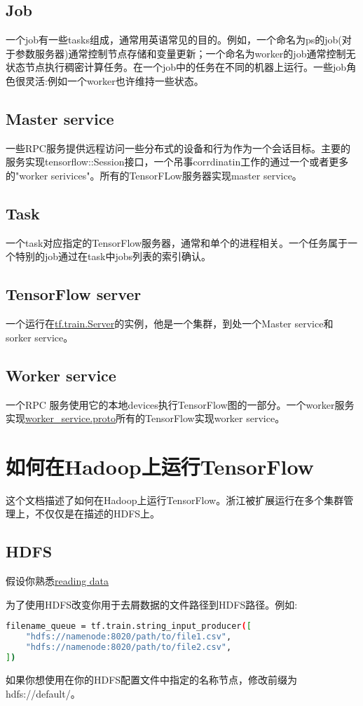 \subsection{Job}
一个job有一些tasks组成，通常用英语常见的目的。例如，一个命名为ps的job(对于参数服务器)通常控制节点存储和变量更新；一个命名为worker的job通常控制无状态节点执行稠密计算任务。在一个job中的任务在不同的机器上运行。一些job角色很灵活:例如一个worker也许维持一些状态。
\subsection{Master service}
一些RPC服务提供远程访问一些分布式的设备和行为作为一个会话目标。主要的服务实现tensorflow::Session接口，一个吊事corrdinatin工作的通过一个或者更多的"worker serivices"。所有的TensorFLow服务器实现master service。
\subsection{Task}
一个task对应指定的TensorFlow服务器，通常和单个的进程相关。一个任务属于一个特别的job通过在task中jobs列表的索引确认。
\subsection{TensorFlow server}
一个运行在\href{https://www.tensorflow.org/api_docs/python/tf/train/Server}{tf.train.Server}的实例，他是一个集群，到处一个Master service和sorker service。
\subsection{Worker service}
一个RPC 服务使用它的本地devices执行TensorFlow图的一部分。一个worker服务实现\href{https://www.github.com/tensorflow/tensorflow/blob/r1.4/tensorflow/core/protobuf/worker_service.proto}{worker\_service.proto}所有的TensorFlow实现worker service。
\section{如何在Hadoop上运行TensorFlow}
这个文档描述了如何在Hadoop上运行TensorFlow。浙江被扩展运行在多个集群管理上，不仅仅是在描述的HDFS上。
\subsection{HDFS}
假设你熟悉\href{https://www.tensorflow.org/api_guides/python/reading_data}{reading data}

为了使用HDFS改变你用于去屑数据的文件路径到HDFS路径。例如:
\begin{lstlisting}[language=Bash]
filename_queue = tf.train.string_input_producer([
    "hdfs://namenode:8020/path/to/file1.csv",
    "hdfs://namenode:8020/path/to/file2.csv",
])
\end{lstlisting}
如果你想使用在你的HDFS配置文件中指定的名称节点，修改前缀为hdfs://default/。

